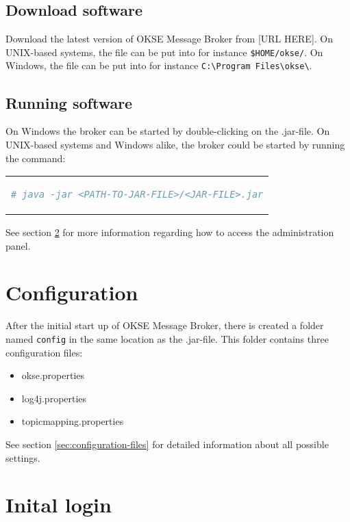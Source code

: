 \subsection{Download software}

Download the latest version of OKSE Message Broker from [URL HERE].
On UNIX-based systems, the file can be put into for instance \verb!$HOME/okse/!. On Windows, the file can be put into for instance \verb!C:\Program Files\okse\!. 

\subsection{Running software}

On Windows the broker can be started by double-clicking on the .jar-file. On UNIX-based systems and Windows alike, the broker could be started by running the command:

\begin{center}
\begin{tabular}{c}
\begin{lstlisting}[language=bash]
    # java -jar <PATH-TO-JAR-FILE>/<JAR-FILE>.jar
\end{lstlisting}
\end{tabular}
\end{center}

See section \ref{sec:inital-login} for more information regarding how to access the administration panel.

\section{Configuration}

After the initial start up of OKSE Message Broker, there is created a folder named \verb!config! in the same location as the .jar-file. This folder contains three configuration files: 

\begin{itemize}
\setlength{\itemsep}{0cm}%
\item okse.properties
\item log4j.properties
\item topicmapping.properties
\end{itemize}

\noindent See section \ref{sec:configuration-files} for detailed information about all possible settings.

\section{Inital login}
\label{sec:inital-login}

